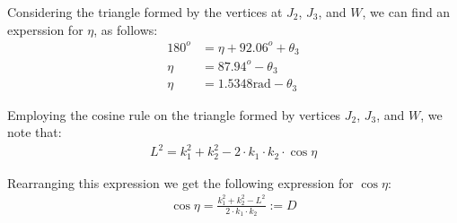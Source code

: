 \documentclass[a4paper]{article}
\begin{document}
\begin{minipage}{0.45\textwidth}
	Considering the triangle formed by the vertices at $J_2$, $J_3$, and $W$, we can find an experssion for $\eta$, as follows:
	\begin{align}
	180^o &= \eta + 92.06^o + \theta_3 \nonumber\\
	\eta &= 87.94^o - \theta_3 \nonumber\\
	\eta &= 1.5348 \si{\radian} - \theta_3
	\end{align}
	
	Employing the cosine rule on the triangle formed by vertices $J_2$, $J_3$, and $W$, we note that:
	\begin{align*}
	L^2 = k_1^2 + k_2^2 - 2 \cdot k_1 \cdot k_2 \cdot \cos \eta
	\end{align*}
	
	Rearranging this expression we get the following expression for $\cos \eta$:
	\begin{align}
	\cos \eta = \frac{k_1^2 + k_2^2 - L^2}{2 \cdot k_1 \cdot k_2} := D
	\end{align}
\end{minipage}
\hspace{1cm}
\end{document}
